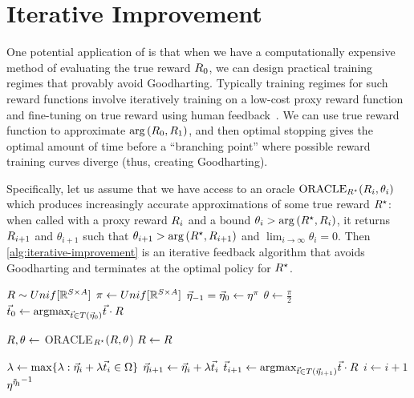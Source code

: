 \section{Iterative Improvement}\label{appendix:iterative_improvement}
One potential application of  is that when we have a computationally expensive method of evaluating the true reward $R_0$, we can design practical training regimes that provably avoid Goodharting. 
Typically training regimes for such reward functions involve iteratively training on a low-cost proxy reward function and fine-tuning on true reward using human feedback~\citep{paulus2017deep}. We can use true reward function to approximate $\mathrm{arg}\left({R_0}, {R_1}\right)$, and then optimal stopping gives the optimal amount of time before a ``branching point'' where possible reward training curves diverge (thus, creating Goodharting). 

Specifically, let us assume that we have access to an oracle $\textrm{ORACLE}_{R^\star}(R_i, \theta_i)$ which produces increasingly accurate approximations of some true reward $R^\star$: when called with a proxy reward $R_i$ and a bound $\theta_i > \mathrm{arg}\left({R^\star}, {R_{i}}\right)$, it returns $R_{i+1}$ and $\theta_{i+1}$ such that $\theta_{i+1} > \mathrm{arg}\left({R^\star}, {R_{i + 1}}\right)$ and $\lim_{i\to \infty}\theta_i = 0$. Then \cref{alg:iterative-improvement} is an iterative feedback algorithm that avoids Goodharting and terminates at the optimal policy for $R^\star$. 

\begin{algorithm}
  \caption{Iterative improvement algorithm}\label{alg:iterative-improvement}
  \begin{algorithmic}[1]
      \State $R \sim Unif[\mathbb{R}^{{S{\times}A}}]$
      \State $\pi \gets Unif[\mathbb{R}^{{S{\times}A}}]$
      \State $\vec{\eta}_{-1} = \vec{\eta}_0 \gets \mathbf{\eta^{\pi}}$
      \State $\theta \gets \frac{\pi}{2}$
      \State $\vec{t}_0 \gets \text{argmax}_{\vec{t} \in T(\vec{\eta}_0)} \vec{t} \cdot R$

          \State $R, \theta \gets$ ORACLE$_{R^\star}(R, \theta$)
          \State $R \gets R$
        \EndWhile

        \State $\lambda \gets \max \{\lambda:\vec{\eta}_i+\lambda \vec{t}_i \in \Omega\}$
        \State $\vec{\eta}_{i+1} \gets \vec{\eta}_i + \lambda \vec{t}_i$
        \State $\vec{t}_{i+1} \gets \text{argmax}_{\vec{t} \in T(\vec{\eta}_{i+1})} \vec{t} \cdot R$
        \State $i \gets i + 1$
      \EndWhile
      \State \Return $\mathbf{\eta^{\vec{\eta}_i}}^{-1}$
   \EndProcedure
  \end{algorithmic}
\end{algorithm}


